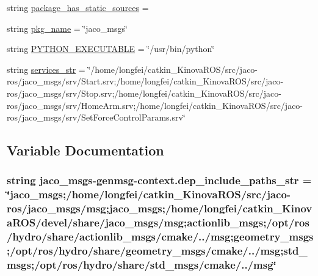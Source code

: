\begin{DoxyCompactItemize}
\item 
string \hyperlink{namespacejaco__msgs-genmsg-context_a1256415124e8f3ceb46c2256ae4626f4}{package\+\_\+has\+\_\+static\+\_\+sources} = \textquotesingle{}\textquotesingle{}
\item 
string \hyperlink{namespacejaco__msgs-genmsg-context_a3990cb49bbd31c83da423fce8baf50ea}{pkg\+\_\+name} = \char`\"{}jaco\+\_\+msgs\char`\"{}
\item 
string \hyperlink{namespacejaco__msgs-genmsg-context_a2658c036e3849ddeebfb3f13d61d6c5d}{P\+Y\+T\+H\+O\+N\+\_\+\+E\+X\+E\+C\+U\+T\+A\+B\+LE} = \char`\"{}/usr/bin/python\char`\"{}
\item 
string \hyperlink{namespacejaco__msgs-genmsg-context_ae9e4dc77a4ea2769807068370b60d144}{services\+\_\+str} = \char`\"{}/home/longfei/catkin\+\_\+\+Kinova\+R\+OS/src/jaco-\/ros/jaco\+\_\+msgs/srv/Start.\+srv;/home/longfei/catkin\+\_\+\+Kinova\+R\+OS/src/jaco-\/ros/jaco\+\_\+msgs/srv/Stop.\+srv;/home/longfei/catkin\+\_\+\+Kinova\+R\+OS/src/jaco-\/ros/jaco\+\_\+msgs/srv/Home\+Arm.\+srv;/home/longfei/catkin\+\_\+\+Kinova\+R\+OS/src/jaco-\/ros/jaco\+\_\+msgs/srv/Set\+Force\+Control\+Params.\+srv\char`\"{}
\end{DoxyCompactItemize}


\subsection{Variable Documentation}
\subsubsection[{\texorpdfstring{dep\+\_\+include\+\_\+paths\+\_\+str}{dep_include_paths_str}}]{\setlength{\rightskip}{0pt plus 5cm}string jaco\+\_\+msgs-\/genmsg-\/context.\+dep\+\_\+include\+\_\+paths\+\_\+str = \char`\"{}jaco\+\_\+msgs;/home/longfei/catkin\+\_\+\+Kinova\+R\+OS/src/jaco-\/ros/jaco\+\_\+msgs/msg;jaco\+\_\+msgs;/home/longfei/catkin\+\_\+\+Kinova\+R\+OS/devel/share/jaco\+\_\+msgs/msg;actionlib\+\_\+msgs;/opt/ros/hydro/share/actionlib\+\_\+msgs/cmake/../msg;geometry\+\_\+msgs;/opt/ros/hydro/share/geometry\+\_\+msgs/cmake/../msg;std\+\_\+msgs;/opt/ros/hydro/share/std\+\_\+msgs/cmake/../msg\char`\"{}}\hypertarget{namespacejaco__msgs-genmsg-context_aa136d364766642fa2a562c6fdde58cf1}{}\label{namespacejaco__msgs-genmsg-context_aa136d364766642fa2a562c6fdde58cf1}
